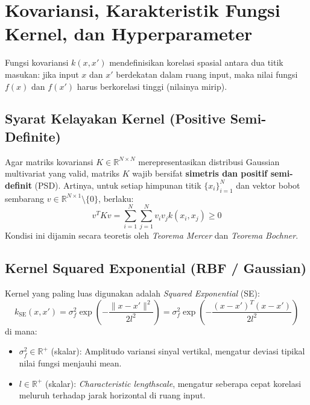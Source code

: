 \documentclass[11pt,a4paper]{article}
\def\mathbf#1{#1}%
\begin{document}
\section{Kovariansi, Karakteristik Fungsi Kernel, dan Hyperparameter}
\label{sec:kernel}

Fungsi kovariansi $k(\mathbf{x}, \mathbf{x}')$ mendefinisikan korelasi spasial antara dua titik masukan: jika input $\mathbf{x}$ dan $\mathbf{x}'$ berdekatan dalam ruang input, maka nilai fungsi $f(\mathbf{x})$ dan $f(\mathbf{x}')$ harus berkorelasi tinggi (nilainya mirip).

\subsection{Syarat Kelayakan Kernel (Positive Semi-Definite)}
Agar matriks kovariansi $K \in \mathbb{R}^{N \times N}$ merepresentasikan distribusi Gaussian multivariat yang valid, matriks $K$ wajib bersifat \textbf{simetris dan positif semi-definit} (PSD). Artinya, untuk setiap himpunan titik $\{ \mathbf{x}_i \}_{i=1}^N$ dan vektor bobot sembarang $\mathbf{v} \in \mathbb{R}^{N \times 1} \setminus \{\mathbf{0}\}$, berlaku:
\begin{equation}
\mathbf{v}^T K \mathbf{v} = \sum_{i=1}^N \sum_{j=1}^N v_i v_j k(\mathbf{x}_i, \mathbf{x}_j) \ge 0
\end{equation}
Kondisi ini dijamin secara teoretis oleh \textit{Teorema Mercer} dan \textit{Teorema Bochner}.

\subsection{Kernel Squared Exponential (RBF / Gaussian)}
Kernel yang paling luas digunakan adalah \textit{Squared Exponential} (SE):
\begin{equation}
k_{\mathrm{SE}}(\mathbf{x}, \mathbf{x}') = \sigma_f^2 \exp\left( -\frac{\|\mathbf{x} - \mathbf{x}'\|^2}{2 l^2} \right) = \sigma_f^2 \exp\left( -\frac{(\mathbf{x} - \mathbf{x}')^T(\mathbf{x} - \mathbf{x}')}{2 l^2} \right)
\end{equation}
di mana:
\begin{itemize}
    \item $\sigma_f^2 \in \mathbb{R}^+$ (skalar): Amplitudo variansi sinyal vertikal, mengatur deviasi tipikal nilai fungsi menjauhi mean.
    \item $l \in \mathbb{R}^+$ (skalar): \textit{Characteristic lengthscale}, mengatur seberapa cepat korelasi meluruh terhadap jarak horizontal di ruang input.
\end{itemize}
\end{document}
